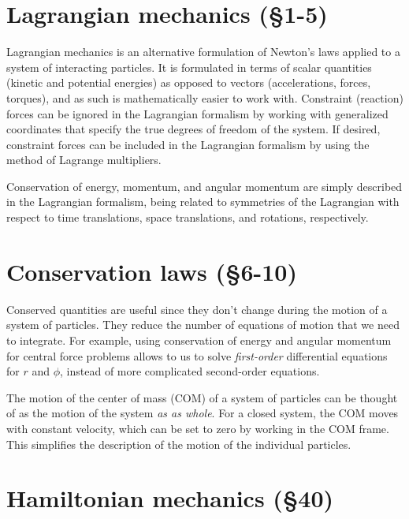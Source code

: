 \documentclass[10pt]{article}
\numberwithin{equation}{section}
\begin{document}
\section{Lagrangian mechanics (\S1-5)}

Lagrangian mechanics is an alternative formulation of
Newton's laws applied to a system of interacting particles.
It is formulated in terms of scalar quantities (kinetic
and potential energies) as opposed to vectors
(accelerations, forces, torques), and as such is mathematically
easier to work with.
Constraint (reaction) forces can be ignored in the 
Lagrangian formalism by working with generalized coordinates
that specify the true degrees of freedom of the system.
If desired, constraint forces can be included in the 
Lagrangian formalism by using the method of Lagrange multipliers.

Conservation of energy, momentum, and angular momentum are 
simply described in the Lagrangian formalism, being related 
to symmetries of the Lagrangian with respect to time 
translations, space translations, and rotations, respectively.

\section{Conservation laws (\S6-10)}

Conserved quantities are useful since they don't change
during the motion of a system of particles.
They reduce the number of equations of motion that we
need to integrate.
For example, using conservation of energy and angular
momentum for central force problems allows to us to 
solve {\em first-order} differential equations for $r$ and $\phi$, 
instead of more complicated second-order equations.

The motion of the center of mass (COM) of a system of 
particles can be thought of as the motion of the system 
{\em as as whole}.  
For a closed system, the COM moves with constant velocity, 
which can be set to zero by working in the COM frame.
This simplifies the description of the motion of the 
individual particles.

\section{Hamiltonian mechanics (\S40)}
\end{document}

